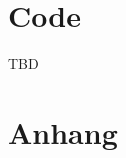 \documentclass{article}
\theoremstyle{nonumberplain}
\begin{document}

\section{Code}

TBD

\section{Anhang}
\end{document}
